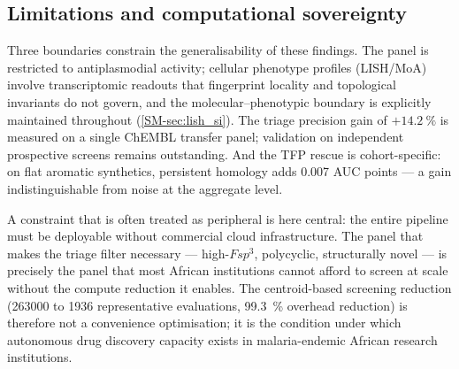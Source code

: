 \subsection{Limitations and computational sovereignty}

Three boundaries constrain the generalisability of these findings. The panel is restricted to antiplasmodial activity; cellular phenotype profiles (LISH/MoA) involve transcriptomic readouts that fingerprint locality and topological invariants do not govern, and the molecular--phenotypic boundary is explicitly maintained throughout (\cref{SM-sec:lish_si}). The triage precision gain of $+\qty{14.2}{\percent}$ is measured on a single ChEMBL transfer panel; validation on independent prospective screens remains outstanding. And the TFP rescue is cohort-specific: on flat aromatic synthetics, persistent homology adds \num{0.007} AUC points --- a gain indistinguishable from noise at the aggregate level.

A constraint that is often treated as peripheral is here central: the entire pipeline must be deployable without commercial cloud infrastructure. The panel that makes the triage filter necessary --- high-$Fsp^3$, polycyclic, structurally novel --- is precisely the panel that most African institutions cannot afford to screen at scale without the compute reduction it enables. The centroid-based screening reduction (\num{263000} to \num{1936} representative evaluations, \qty{99.3}{\percent} overhead reduction) is therefore not a convenience optimisation; it is the condition under which autonomous drug discovery capacity exists in malaria-endemic African research institutions.
